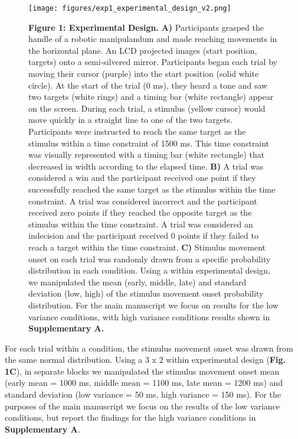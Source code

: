 \documentclass[man,donotrepeattitle,floatsintext,letterpaper,12pt]{apa7}
\newcommand\boldblue[1]{\textcolor{mydarkblue}{\textbf{#1}}}
\begin{document}
\begin{figure}[H]
  \centering
  \texttt{[image: figures/exp1\_experimental\_design\_v2.png]}
  \caption*{\boldblue{Figure 1: Experimental Design.} \boldblue{A)} Participants grasped the handle of a robotic manipulandum and made reaching movements in the horizontal plane. An LCD projected images (start position, targets) onto a semi-silvered mirror. Participants began each trial by moving their cursor (purple) into the start position (solid white circle). At the start of the trial (0 ms), they heard a tone and saw two targets (white rings) and a timing bar (white rectangle) appear on the screen. During each trial, a stimulus (yellow cursor) would move quickly in a straight line to one of the two targets. Participants were instructed to reach the same target as the stimulus within a time constraint of 1500 ms. This time constraint was visually represented with a timing bar (white rectangle) that decreased in width according to the elapsed time. \boldblue{B)} A trial was considered a win and the participant received one point if they successfully reached the same target as the stimulus within the time constraint. A trial was considered incorrect and the participant received zero points if they reached the opposite target as the stimulus within the time constraint. A trial was considered an indecision and the participant received 0 points if they failed to reach a target within the time constraint. \boldblue{C)} Stimulus movement onset on each trial was randomly drawn from a specific probability distribution in each condition. Using a within experimental design, we manipulated the mean (early, middle, late) and standard deviation (low, high) of the stimulus movement onset probability distribution. For the main manuscript we focus on results for the low variance conditions, with high variance conditions results shown in \boldblue{Supplementary A.}}
\end{figure}

For each trial within a condition, the stimulus movement onset was drawn from the same normal distribution. Using a 3 x 2 within experimental design (\boldblue{Fig. 1C}), in separate blocks we manipulated the stimulus movement onset mean (early mean = 1000 ms, middle mean = 1100 ms, late mean = 1200 ms) and standard deviation (low variance = 50 ms, high variance = 150 ms). For the purposes of the main manuscript we focus on the results of the low variance conditions, but report the findings for the high variance conditions in \boldblue{Supplementary A}.
\end{document}
